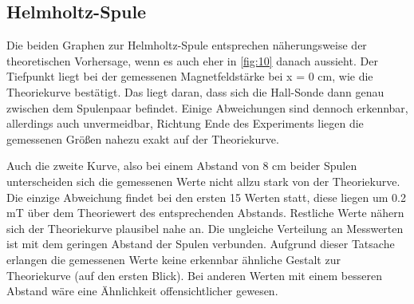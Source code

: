 \subsection{Helmholtz-Spule}
Die beiden Graphen zur Helmholtz-Spule entsprechen näherungsweise der theoretischen 
Vorhersage, wenn es auch eher in \autoref{fig:10} danach aussieht. Der Tiefpunkt 
liegt bei der gemessenen Magnetfeldstärke bei x = 0 cm, wie die Theoriekurve 
bestätigt. Das liegt daran, dass sich die Hall-Sonde dann genau zwischen dem 
Spulenpaar befindet. Einige Abweichungen sind dennoch erkennbar, allerdings 
auch unvermeidbar, Richtung Ende des Experiments liegen die gemessenen Größen 
nahezu exakt auf der Theoriekurve.
\par\vspace{0.5em}
Auch die zweite Kurve, also bei einem Abstand von 8 cm beider Spulen unterscheiden 
sich die gemessenen Werte nicht allzu stark von der Theoriekurve. Die einzige 
Abweichung findet bei den ersten 15 Werten statt, diese liegen um 0.2 
\unit{\milli\tesla} über dem Theoriewert des entsprechenden Abstands. Restliche 
Werte nähern sich der Theoriekurve plausibel nahe an. Die ungleiche Verteilung 
an Messwerten ist mit dem geringen Abstand der Spulen verbunden. Aufgrund dieser 
Tatsache erlangen die gemessenen Werte keine erkennbar ähnliche Gestalt zur 
Theoriekurve (auf den ersten Blick). Bei anderen Werten mit einem besseren 
Abstand wäre eine Ähnlichkeit offensichtlicher gewesen.